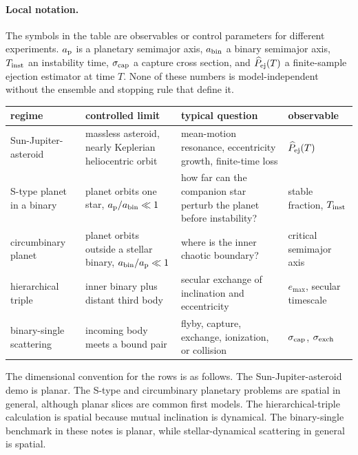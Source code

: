 \paragraph{Local notation.}
The symbols in the table are observables or control parameters for different
experiments.  \(a_{\rm p}\) is a planetary semimajor axis,
\(a_{\rm bin}\) a binary semimajor axis, \(T_{\rm inst}\) an instability time,
\(\sigma_{\rm cap}\) a capture cross section, and
\(\widehat P_{\rm ej}(T)\) a finite-sample ejection estimator at time \(T\).
None of these numbers is model-independent without the ensemble and stopping
rule that define it.

\begin{center}
\small
\setlength{\tabcolsep}{3pt}
\begin{tabular}{@{}p{} p{} p{} p{}@{}}
\hline
regime & controlled limit & typical question & observable\\
\hline
Sun-Jupiter-asteroid &
massless asteroid, nearly Keplerian heliocentric orbit &
mean-motion resonance, eccentricity growth, finite-time loss &
\(\widehat P_{\rm ej}(T)\)\\
S-type planet in a binary &
planet orbits one star, \(a_{\rm p}/a_{\rm bin}\ll1\) &
how far can the companion star perturb the planet before instability? &
stable fraction, \(T_{\rm inst}\)\\
circumbinary planet &
planet orbits outside a stellar binary, \(a_{\rm bin}/a_{\rm p}\ll1\) &
where is the inner chaotic boundary? &
critical semimajor axis\\
hierarchical triple &
inner binary plus distant third body &
secular exchange of inclination and eccentricity &
\(e_{\max}\), secular timescale\\
binary-single scattering &
incoming body meets a bound pair &
flyby, capture, exchange, ionization, or collision &
\(\sigma_{\rm cap}\), \(\sigma_{\rm exch}\)\\
\hline
\end{tabular}
\end{center}

The dimensional convention for the rows is as follows.  The
Sun-Jupiter-asteroid demo is planar.  The S-type and circumbinary planetary
problems are spatial in general, although planar slices are common first
models.  The hierarchical-triple calculation is spatial because mutual
inclination is dynamical.  The binary-single benchmark in these notes is
planar, while stellar-dynamical scattering in general is spatial.

